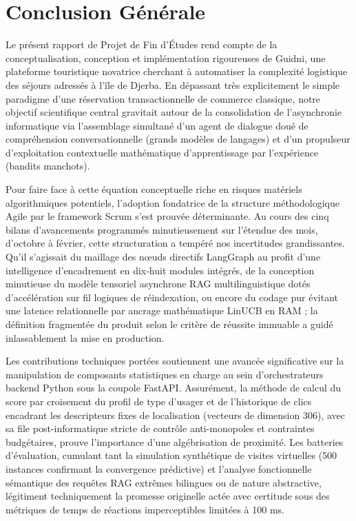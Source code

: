 \chapter*{Conclusion Générale}

Le présent rapport de Projet de Fin d'Études rend compte de la conceptualisation, conception et implémentation rigoureuses de Guidni, une plateforme touristique novatrice cherchant à automatiser la complexité logistique des séjours adressés à l'île de Djerba. En dépassant très explicitement le simple paradigme d'une réservation transactionnelle de commerce classique, notre objectif scientifique central gravitait autour de la consolidation de l'asynchronie informatique via l'assemblage simultané d'un agent de dialogue doué de compréhension conversationnelle (grands modèles de langages) et d'un propulseur d'exploitation contextuelle mathématique d'apprentissage par l'expérience (bandits manchots).

Pour faire face à cette équation conceptuelle riche en risques matériels algorithmiques potentiels, l'adoption fondatrice de la structure méthodologique Agile par le framework Scrum s'est prouvée déterminante. Au cours des cinq bilans d'avancements programmés minutieusement sur l'étendue des mois, d'octobre à février, cette structuration a tempéré nos incertitudes grandissantes. Qu'il s'agissait du maillage des nœuds directifs LangGraph au profit d'une intelligence d'encadrement en dix-huit modules intégrés, de la conception minutieuse du modèle tensoriel asynchrone RAG multilinguistique dotés d'accélération sur fil logiques de réindexation, ou encore du codage pur évitant une latence relationnelle par ancrage mathématique LinUCB en RAM ; la définition fragmentée du produit selon le critère de réussite immuable a guidé inlassablement la mise en production.

Les contributions techniques portées soutiennent une avancée significative sur la manipulation de composants statistiques en charge au sein d'orchestrateurs backend Python sous la coupole FastAPI. Assurément, la méthode de calcul du score par croisement du profil de type d'usager et de l'historique de clics encadrant les descripteurs fixes de localisation (vecteurs de dimension 306), avec sa file post-informatique stricte de contrôle anti-monopoles et contraintes budgétaires, prouve l'importance d'une algébrisation de proximité. Les batteries d'évaluation, cumulant tant la simulation synthétique de visites virtuelles (500 instances confirmant la convergence prédictive) et l'analyse fonctionnelle sémantique des requêtes RAG extrêmes bilingues ou de nature abstractive, légitiment techniquement la promesse originelle actée avec certitude sous des métriques de temps de réactions imperceptibles limitées à 100 ms.

